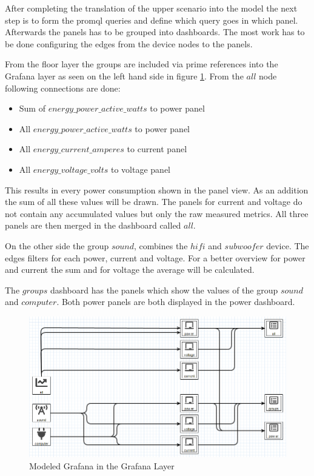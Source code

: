 After completing the translation of the upper scenario into the model the next step is to form the \gls{promql} queries and define which query goes in which panel. Afterwards the panels has to be grouped into dashboards. The most work has to be done configuring the edges from the device nodes to the panels.

From the floor layer the groups are included via prime references into the Grafana layer as seen on the left hand side in figure \ref{fig:modelGrafanaLayer}. From the $all$ node following connections are done:

\begin{itemize}
	\item Sum of $energy\_power\_active\_watts$ to power panel
	\item All $energy\_power\_active\_watts$ to power panel
	\item All $energy\_current\_amperes$ to current panel
 	\item All $energy\_voltage\_volts$ to voltage panel
\end{itemize}

This results in every power consumption shown in the panel view. As an addition the sum of all these values will be drawn. The panels for current and voltage do not contain any accumulated values but only the raw measured metrics. All three panels are then merged in the dashboard called $all$.

On the other side the group $sound$, combines the $hifi$ and $subwoofer$ device. The edges filters for each power, current and voltage. For a better overview for power and current the sum and for voltage the average will be calculated. 

The $groups$ dashboard has the panels which show the values of the group $sound$ and $computer$. Both power panels are both displayed in the power dashboard.

\begin{figure}[!ht]
	\centering 
	\includegraphics[width=\linewidth]{assets/images/grafanaLayer}
	\caption{Modeled Grafana in the Grafana Layer}
	\label{fig:modelGrafanaLayer}
\end{figure}


